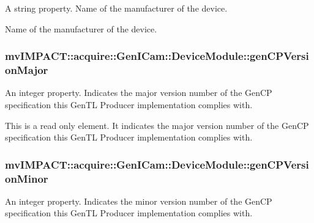 A string property. Name of the manufacturer of the device. 

Name of the manufacturer of the device. \hypertarget{classmv_i_m_p_a_c_t_1_1acquire_1_1_gen_i_cam_1_1_device_module_a2d45de4ae220c0c4f028c2b7cabdc74b}{
\subsubsection[{gen\+C\+P\+Version\+Major}]{ mv\+I\+M\+P\+A\+C\+T\+::acquire\+::\+Gen\+I\+Cam\+::\+Device\+Module\+::gen\+C\+P\+Version\+Major}}\label{classmv_i_m_p_a_c_t_1_1acquire_1_1_gen_i_cam_1_1_device_module_a2d45de4ae220c0c4f028c2b7cabdc74b}


An integer property. Indicates the major version number of the Gen\+C\+P specification this Gen\+T\+L Producer implementation complies with. 

This is a read only element. It indicates the major version number of the Gen\+C\+P specification this Gen\+T\+L Producer implementation complies with. \hypertarget{classmv_i_m_p_a_c_t_1_1acquire_1_1_gen_i_cam_1_1_device_module_aa5487e1d2944234b6e71abb1715d2982}{
\subsubsection[{gen\+C\+P\+Version\+Minor}]{ mv\+I\+M\+P\+A\+C\+T\+::acquire\+::\+Gen\+I\+Cam\+::\+Device\+Module\+::gen\+C\+P\+Version\+Minor}}\label{classmv_i_m_p_a_c_t_1_1acquire_1_1_gen_i_cam_1_1_device_module_aa5487e1d2944234b6e71abb1715d2982}


An integer property. Indicates the minor version number of the Gen\+C\+P specification this Gen\+T\+L Producer implementation complies with. 

